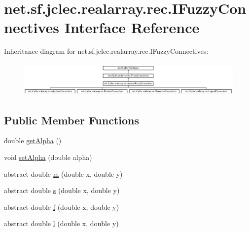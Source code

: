 \hypertarget{interfacenet_1_1sf_1_1jclec_1_1realarray_1_1rec_1_1_i_fuzzy_connectives}{\section{net.\-sf.\-jclec.\-realarray.\-rec.\-I\-Fuzzy\-Connectives Interface Reference}
\label{interfacenet_1_1sf_1_1jclec_1_1realarray_1_1rec_1_1_i_fuzzy_connectives}
}
Inheritance diagram for net.\-sf.\-jclec.\-realarray.\-rec.\-I\-Fuzzy\-Connectives\-:\begin{figure}[H]
\begin{center}
\leavevmode
\includegraphics[height=1.766562cm]{interfacenet_1_1sf_1_1jclec_1_1realarray_1_1rec_1_1_i_fuzzy_connectives}
\end{center}
\end{figure}
\subsection*{Public Member Functions}
\begin{DoxyCompactItemize}
\item 
double \hyperlink{interfacenet_1_1sf_1_1jclec_1_1realarray_1_1rec_1_1_i_fuzzy_connectives_a307541244373dc0e116dc64452b1e354}{get\-Alpha} ()
\item 
void \hyperlink{interfacenet_1_1sf_1_1jclec_1_1realarray_1_1rec_1_1_i_fuzzy_connectives_a33e828ad2d1f45c8485c7cc1c9512949}{set\-Alpha} (double alpha)
\item 
abstract double \hyperlink{interfacenet_1_1sf_1_1jclec_1_1realarray_1_1rec_1_1_i_fuzzy_connectives_acd07fed683410b0147e04075b8d6aea6}{m} (double x, double y)
\item 
abstract double \hyperlink{interfacenet_1_1sf_1_1jclec_1_1realarray_1_1rec_1_1_i_fuzzy_connectives_a2ae764e485434e088a8128a9e2bea734}{s} (double x, double y)
\item 
abstract double \hyperlink{interfacenet_1_1sf_1_1jclec_1_1realarray_1_1rec_1_1_i_fuzzy_connectives_a970200edf4d66083e0ad040096783c35}{f} (double x, double y)
\item 
abstract double \hyperlink{interfacenet_1_1sf_1_1jclec_1_1realarray_1_1rec_1_1_i_fuzzy_connectives_a0cea5560723101682211330bba9e20e4}{l} (double x, double y)
\end{DoxyCompactItemize}


